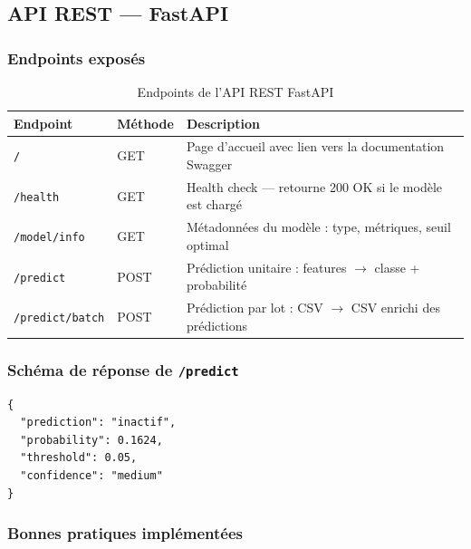 \documentclass[12pt,a4paper]{article}
\begin{document}
\subsection{API REST --- FastAPI}

\subsubsection{Endpoints exposés}

\begin{table}[H]
  \centering
  \caption{Endpoints de l'API REST FastAPI}
  \label{tab:endpoints}
  \begin{tabularx}{\linewidth}{llL}
    \toprule
    \textbf{Endpoint} & \textbf{Méthode} & \textbf{Description} \\
    \midrule
    \texttt{/} & GET & Page d'accueil avec lien vers la documentation Swagger \\
    \texttt{/health} & GET & Health check --- retourne 200 OK si le modèle est chargé \\
    \texttt{/model/info} & GET & Métadonnées du modèle : type, métriques, seuil optimal \\
    \texttt{/predict} & POST & Prédiction unitaire : features $\to$ classe + probabilité \\
    \texttt{/predict/batch} & POST & Prédiction par lot : CSV $\to$ CSV enrichi des prédictions \\
    \bottomrule
  \end{tabularx}
\end{table}

\subsubsection{Schéma de réponse de \texttt{/predict}}

\begin{lstlisting}[caption={Exemple de réponse JSON --- endpoint /predict}, label=lst:predict_response, language={}]
{
  "prediction": "inactif",
  "probability": 0.1624,
  "threshold": 0.05,
  "confidence": "medium"
}
\end{lstlisting}

\subsubsection{Bonnes pratiques implémentées}
\end{document}
